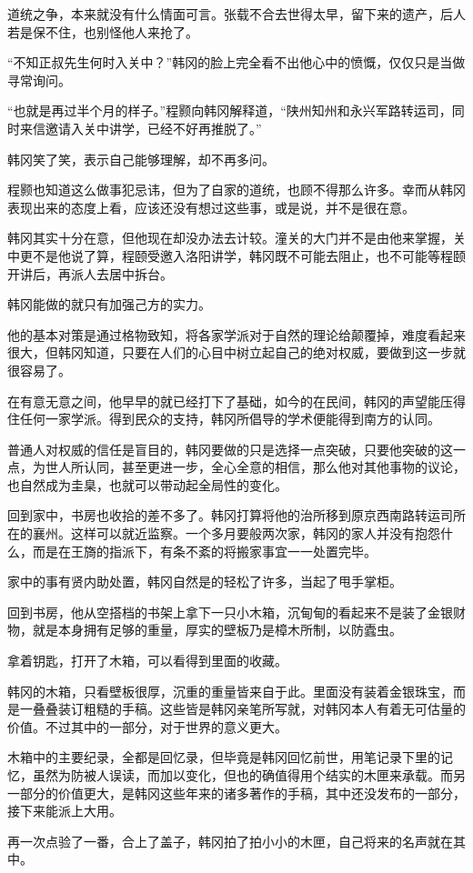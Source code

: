 道统之争，本来就没有什么情面可言。张载不合去世得太早，留下来的遗产，后人若是保不住，也别怪他人来抢了。

“不知正叔先生何时入关中？”韩冈的脸上完全看不出他心中的愤慨，仅仅只是当做寻常询问。

“也就是再过半个月的样子。”程颢向韩冈解释道，“陕州知州和永兴军路转运司，同时来信邀请入关中讲学，已经不好再推脱了。”

韩冈笑了笑，表示自己能够理解，却不再多问。

程颢也知道这么做事犯忌讳，但为了自家的道统，也顾不得那么许多。幸而从韩冈表现出来的态度上看，应该还没有想过这些事，或是说，并不是很在意。

韩冈其实十分在意，但他现在却没办法去计较。潼关的大门并不是由他来掌握，关中更不是他说了算，程颐受邀入洛阳讲学，韩冈既不可能去阻止，也不可能等程颐开讲后，再派人去居中拆台。

韩冈能做的就只有加强己方的实力。

他的基本对策是通过格物致知，将各家学派对于自然的理论给颠覆掉，难度看起来很大，但韩冈知道，只要在人们的心目中树立起自己的绝对权威，要做到这一步就很容易了。

在有意无意之间，他早早的就已经打下了基础，如今的在民间，韩冈的声望能压得住任何一家学派。得到民众的支持，韩冈所倡导的学术便能得到南方的认同。

普通人对权威的信任是盲目的，韩冈要做的只是选择一点突破，只要他突破的这一点，为世人所认同，甚至更进一步，全心全意的相信，那么他对其他事物的议论，也自然成为圭臬，也就可以带动起全局性的变化。

回到家中，书房也收拾的差不多了。韩冈打算将他的治所移到原京西南路转运司所在的襄州。这样可以就近监察。一个多月要般两次家，韩冈的家人并没有抱怨什么，而是在王旖的指派下，有条不紊的将搬家事宜一一处置完毕。

家中的事有贤内助处置，韩冈自然是的轻松了许多，当起了甩手掌柜。

回到书房，他从空搭档的书架上拿下一只小木箱，沉甸甸的看起来不是装了金银财物，就是本身拥有足够的重量，厚实的壁板乃是樟木所制，以防蠹虫。

拿着钥匙，打开了木箱，可以看得到里面的收藏。

韩冈的木箱，只看壁板很厚，沉重的重量皆来自于此。里面没有装着金银珠宝，而是一叠叠装订粗糙的手稿。这些皆是韩冈亲笔所写就，对韩冈本人有着无可估量的价值。不过其中的一部分，对于世界的意义更大。

木箱中的主要纪录，全都是回忆录，但毕竟是韩冈回忆前世，用笔记录下里的记忆，虽然为防被人误读，而加以变化，但也的确值得用个结实的木匣来承载。而另一部分的价值更大，是韩冈这些年来的诸多著作的手稿，其中还没发布的一部分，接下来能派上大用。

再一次点验了一番，合上了盖子，韩冈拍了拍小小的木匣，自己将来的名声就在其中。

